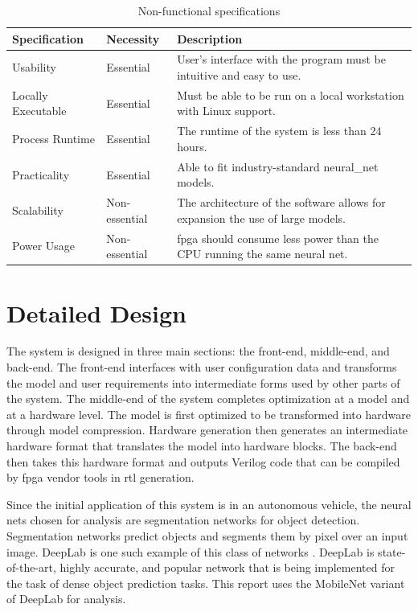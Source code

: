 \documentclass{uw-ece-wkrpt}
\begin{document}
\begin{table}[H]
\centering
\caption{Non-functional specifications}\label{tab:non-func_specs}
\begin{tabularx}{\textwidth}{llX}
\toprule
Specification & Necessity & Description \\
\midrule
Usability & Essential & User's interface with the program must be intuitive and easy to use. \\
Locally Executable & Essential & Must be able to be run on a local workstation with Linux support. \\
Process Runtime & Essential & The runtime of the system is less than 24 hours. \\
Practicality & Essential & Able to fit industry-standard \gls{neural_net} models. \\
Scalability & Non-essential & The architecture of the software allows for expansion the use of large models. \\
Power Usage & Non-essential & \gls{fpga} should consume less power than the CPU running the same neural net. \\
\bottomrule
\end{tabularx}
\end{table}

\section{Detailed Design}

The system is designed in three main sections: the front-end, middle-end, and back-end. The front-end interfaces with user configuration data and transforms the model and user requirements into intermediate forms used by other parts of the system. The middle-end of the system completes optimization at a model and at a hardware level. The model is first optimized to be transformed into hardware through model compression. Hardware generation then generates an intermediate hardware format that translates the model into hardware blocks. The back-end then takes this hardware format and outputs Verilog code that can be compiled by \gls{fpga} vendor tools in \gls{rtl} generation.

Since the initial application of this system is in an autonomous vehicle, the neural nets chosen for analysis are segmentation networks for object detection. Segmentation networks predict objects and segments them by pixel over an input image. DeepLab is one such example of this class of networks \cite{Chen2018DeepLab:-Semant}. DeepLab is state-of-the-art, highly accurate, and popular network that is being implemented for the task of dense object prediction tasks. This report uses the MobileNet variant of DeepLab for analysis.
\end{document}

